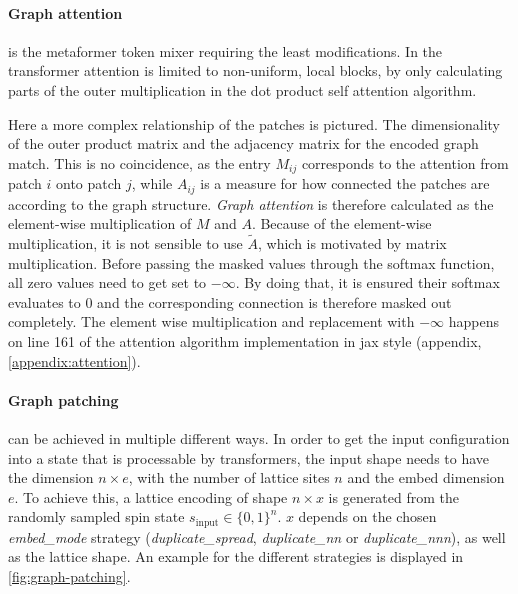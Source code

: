 \paragraph{Graph attention} is the metaformer token mixer requiring the least modifications.
In \cite{swinTransformerPaper} the transformer attention is limited to non-uniform, local blocks, by only calculating parts of the outer multiplication in the dot product self attention algorithm. %

Here a more complex relationship of the patches is pictured. 
The dimensionality of the outer product matrix and the adjacency matrix for the encoded graph match. %
This is no coincidence, as the entry $M_{ij}$ corresponds to the attention from patch $i$ onto patch $j$, while $A_{ij}$ is a measure for how \glqq connected\grqq{} the patches are according to the graph structure.
\emph{Graph attention} is therefore calculated as the element-wise multiplication of $M$ and $A$.
Because of the element-wise multiplication, it is not sensible to use $\tilde{A}$, which is motivated by matrix multiplication.
Before passing the masked values through the softmax function, all zero values need to get set to $-\infty$.
By doing that, it is ensured their softmax evaluates to 0 and the corresponding connection is therefore masked out completely.
The element wise multiplication and replacement with $-\infty$ happens on line 161 of the attention algorithm implementation in jax style (appendix, \ref{appendix:attention}).

\paragraph{Graph patching} can be achieved in multiple different ways.
In order to get the input configuration into a state that is processable by transformers, the input shape needs to have the dimension $n \times e$, with the number of lattice sites $n$ and the embed dimension $e$.
To achieve this, a lattice encoding of shape $n \times x$ is generated from the randomly sampled spin state $s_\mathrm{input} \in \{0,1\}^n$.
$x$ depends on the chosen \emph{embed\_mode} strategy (\emph{duplicate\_spread}, \emph{duplicate\_nn} or \emph{duplicate\_nnn}), as well as the lattice shape. 
An example for the different strategies is displayed in \autoref{fig:graph-patching}.

